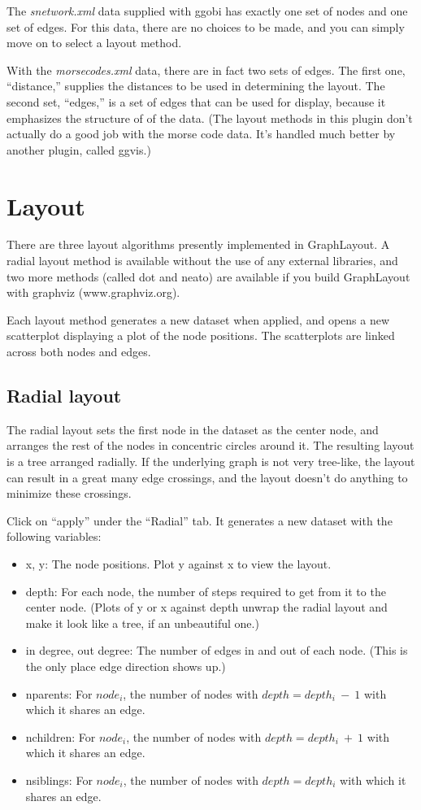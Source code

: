\documentclass[11pt]{article}
\begin{document}
The {\em snetwork.xml} data supplied with ggobi has exactly one set of
nodes and one set of edges.  For this data, there are no choices to be
made, and you can simply move on to select a layout method.

With the {\em morsecodes.xml} data, there are in fact two sets of edges.
The first one, ``distance,'' supplies the distances to be used in
determining the layout.  The second set, ``edges,'' is a set of edges
that can be used for display, because it emphasizes the structure of
of the data.  (The layout methods in this plugin don't actually do a
good job with the morse code data.  It's handled much better by another
plugin, called ggvis.)

\section{Layout}

There are three layout algorithms presently implemented in GraphLayout.
A radial layout method is available without the use of any external
libraries, and two more methods (called dot and neato) are available
if you build GraphLayout with graphviz (www.graphviz.org).

Each layout method generates a new dataset when applied, and opens
a new scatterplot displaying a plot of the node positions.  The
scatterplots are linked across both nodes and edges.

\subsection {Radial layout}

The radial layout \cite{Wills99} sets the first node in the dataset
as the center node, and arranges the rest of the nodes in concentric
circles around it.  The resulting layout is a tree arranged radially.
If the underlying graph is not very tree-like, the layout can result
in a great many edge crossings, and the layout doesn't do anything to
minimize these crossings.

Click on ``apply'' under the ``Radial'' tab.  It generates a new
dataset with the following variables:

\begin{itemize}
\item x, y: The node positions.  Plot y against x to view the layout.
\item depth: For each node, the number of steps required to get from it
  to the center node. (Plots of y or x against depth unwrap the
  radial layout and make it look like a tree, if an unbeautiful one.)
\item in degree, out degree:  The number of edges in and out of each
  node. (This is the only place edge direction shows up.)
\item nparents: For $node_i$, the number of nodes with $depth = depth_i~-~1$
  with which it shares an edge. 
\item nchildren: For $node_i$, the number of nodes with $depth = depth_i~+~1$
  with which it shares an edge.
\item nsiblings: For $node_i$, the number of nodes with $depth = depth_i$
  with which it shares an edge.
\end{itemize}
\end{document}
